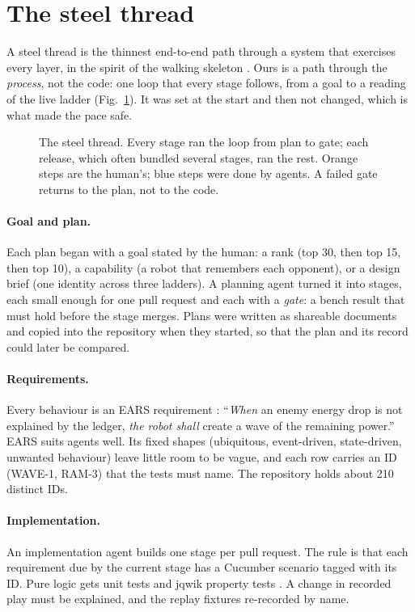 \documentclass[10pt,twocolumn]{article}
\newcommand{\req}[1]{\textsf{#1}}
\begin{document}
\section{The steel thread}\label{sec:thread}

A steel thread is the thinnest end-to-end path through a system that exercises every layer, in the
spirit of the walking skeleton \cite{freeman2009}. Ours is a path through the \emph{process}, not
the code: one loop that every stage follows, from a goal to a reading of the live ladder
(Fig.~\ref{fig:thread}). It was set at the start and then not changed, which is what made the
pace safe.

\begin{figure}[t]
\centering
\resizebox{\columnwidth}{!}{}
\caption{The steel thread. Every stage ran the loop from plan to gate; each release, which often
bundled several stages, ran the rest. Orange steps are the human's; blue steps were done by agents. A failed gate returns to the plan, not to the code.}
\label{fig:thread}
\end{figure}

\paragraph{Goal and plan.} Each plan began with a goal stated by the human: a rank (top 30, then
top 15, then top 10), a capability (a robot that remembers each opponent), or a design brief (one
identity across three ladders). A planning agent turned it into stages, each small enough for one
pull request and each with a \emph{gate}: a bench result that must hold before the stage merges.
Plans were written as shareable documents and copied into the repository when they started, so
that the plan and its record could later be compared.

\paragraph{Requirements.} Every behaviour is an EARS requirement \cite{mavin2009}: ``\emph{When} an
enemy energy drop is not explained by the ledger, \emph{the robot shall} create a wave of the
remaining power.'' EARS suits agents well. Its fixed shapes (ubiquitous, event-driven,
state-driven, unwanted behaviour) leave little room to be vague, and each row carries an ID
(\req{WAVE-1}, \req{RAM-3}) that the tests must name. The repository holds about 210 distinct IDs.

\paragraph{Implementation.} An implementation agent builds one stage per pull request. The
rule is that each requirement due by the current stage has a Cucumber scenario tagged with its ID.
Pure logic gets unit tests and jqwik property tests \cite{claessen2000}. A change in recorded play
must be explained, and the replay fixtures re-recorded by name.
\end{document}
